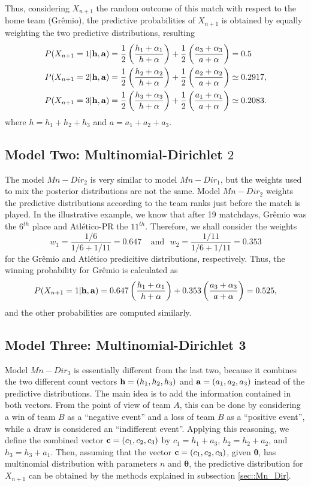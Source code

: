 \documentclass[journal,article,accept,moreauthors,pdftex,12pt,a4paper]{mdpi}
\begin{document}
Thus, considering $X_{n + 1}$ the random outcome of this match with
respect to the home team (Gr\^{e}mio), the predictive probabilities
of $X_{n + 1}$ is obtained by equally weighting the two predictive
distributions, resulting
\begin{align*}
P(X_{n+1}=1|{\bf h}, {\bf a}) &=
\frac{1}{2}\left(\frac{h_1+\alpha_1}{h+\alpha}\right)+\frac{1}{2}\left(\frac{a_3+\alpha_3}{a+\alpha}\right)=0.5
\\
P(X_{n+1}=2|{\bf h}, {\bf a}) &=
\frac{1}{2}\left(\frac{h_2+\alpha_2}{h+\alpha}\right)+\frac{1}{2}\left(\frac{a_2+\alpha_2}{a+\alpha}\right)\simeq0.2917, \\
P(X_{n+1}=3|{\bf h}, {\bf a}) &= \frac{1}{2}
\left(\frac{h_3+\alpha_3}{h+\alpha}\right)+\frac{1}{2}\left(\frac{a_1+\alpha_1}{a+\alpha}\right)\simeq0.2083.
\end{align*}
\noindent where $h=h_1+h_2+h_3$ and $a=a_1+a_2+a_3$.

\subsection{Model Two: Multinomial-Dirichlet $2$}
\label{sec::Mn_Dir2}

The model $Mn-Dir_2$ is very similar to model $Mn-Dir_1$, but the
weights used to mix the posterior distributions are not the same.
Model $Mn-Dir_2$ weights the predictive distributions according to
the team ranks just before the match is played. In the illustrative
example, we know that after 19 matchdays, Gr\^emio was the $6^{th}$
place and Atl\'etico-PR the $11^{th}$. Therefore, we shall consider
the weights
\[w_1 = \frac{1/6}{1/6+1/11}=0.647 ~ ~ ~ ~ ~\text{and} ~ ~ ~ w_2 = \frac{1/11}{1/6+1/11}=0.353\]
\noindent for the Gr\^emio and Atl\'etico predicitive distributions,
respectively. Thus, the winning probability for Gr\^emio is
calculated as
\[P(X_{n+1}= 1|{\bf h}, {\bf a})=0.647\left(\frac{h_1+\alpha_1}{h+\alpha}\right)+0.353\left(\frac{a_3+\alpha_3}{a+\alpha}\right)=0.525,\]
\noindent and the other probabilities are computed similarly.

\subsection{Model Three: Multinomial-Dirichlet 3}
\label{sec::Mn_Dir3}

Model $Mn-Dir_3$ is essentially different from the
last two, because it combines the two different count vectors ${\bf
h} = (h_1, h_2, h_3)$ and ${\bf a} = (a_1, a_2, a_3)$ instead of the
predictive distributions. The main idea is to add the information
contained in both vectors. From the point of view of team $A$, this can
be done by considering a win of team $B$ as a ``negative event'' and a
loss of team $B$ as a ``positive event'', while a draw is
considered an ``indifferent event''. Applying this reasoning,
we define the combined vector ${\bf c} = (c_1, c_2, c_3)$ by $c_1 =
h_1 + a_3$, $h_2 = h_2 + a_2$, and $h_3 = h_3 + a_1$. Then, assuming that the vector ${\bf c} = (c_1, c_2, c_3)$, given $\boldsymbol{\theta}$, has multinomial distribution with parameters $n$ and
$\boldsymbol{\theta}$, the predictive distribution for $X_{n + 1}$ can
be obtained by the methods explained in subsection
\ref{sec::Mn_Dir}.
\end{document}
